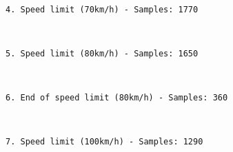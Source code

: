 \documentclass[11pt]{article}
\begin{document}
    \begin{center}
    \end{center}
    { \hspace*{\fill} \\}
    
    \begin{Verbatim}[commandchars=\\\{\}]
4. Speed limit (70km/h) - Samples: 1770

    \end{Verbatim}

    \begin{center}
    \end{center}
    { \hspace*{\fill} \\}
    
    \begin{Verbatim}[commandchars=\\\{\}]
5. Speed limit (80km/h) - Samples: 1650

    \end{Verbatim}

    \begin{center}
    \end{center}
    { \hspace*{\fill} \\}
    
    \begin{Verbatim}[commandchars=\\\{\}]
6. End of speed limit (80km/h) - Samples: 360

    \end{Verbatim}

    \begin{center}
    \end{center}
    { \hspace*{\fill} \\}
    
    \begin{Verbatim}[commandchars=\\\{\}]
7. Speed limit (100km/h) - Samples: 1290

    \end{Verbatim}

    \begin{center}
    \end{center}
    { \hspace*{\fill} \\}
    
\end{document}
